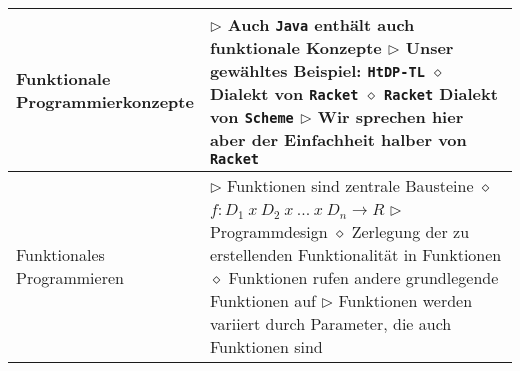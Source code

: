   \begin{tabular}{ | p{} p{} | } 
  \hline 
  
  \makecell[l]{Funktionale \\ Programmierkonzepte} & \makecell[l]{
  $\triangleright$ Auch \texttt{Java} enthält auch funktionale Konzepte \\
  $\triangleright$ Unser gewähltes Beispiel: \texttt{HtDP-TL} \\
  \hspace{0.4cm} $\diamond$ Dialekt von \texttt{Racket} \\
  \hspace{0.4cm} $\diamond$ \texttt{Racket} Dialekt von \texttt{Scheme} \\
  $\triangleright$ Wir sprechen hier aber der Einfachheit halber von \texttt{Racket}} \\ \hline
  
  \makecell[l]{Funktionales \\ Programmieren} & \makecell[l]{
  $\triangleright$ Funktionen sind zentrale Bausteine \\
  \hspace{0.4cm} $\diamond$ $f: D_1 ~ x ~ D_2 ~ x ~ ... ~ x ~ D_n \rightarrow R$ \\
  $\triangleright$ Programmdesign \\
  \hspace{0.4cm} $\diamond$ Zerlegung der zu erstellenden Funktionalität in Funktionen \\
  \hspace{0.4cm} $\diamond$ Funktionen rufen andere grundlegende Funktionen auf \\
  $\triangleright$ Funktionen werden variiert durch Parameter, die auch Funktionen sind } \\ \hline


\end{tabular}
